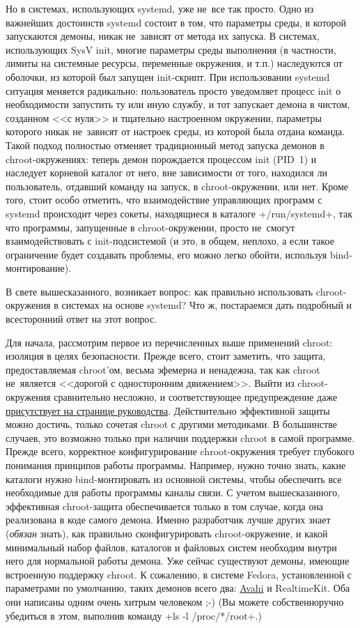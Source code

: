 \documentclass[10pt,oneside,a4paper]{article}
\begin{document}
Но в системах, использующих systemd, уже не~все так просто. Одно из важнейших
достоинств systemd состоит в том, что параметры среды, в которой запускаются
демоны, никак не~зависят от метода их запуска. В системах, использующих SysV
init, многие параметры среды выполнения (в частности, лимиты на системные
ресурсы, переменные окружения, и т.п.) наследуются от оболочки, из которой был
запущен init-скрипт. При использовании systemd ситуация меняется радикально:
пользователь просто уведомляет процесс init о необходимости запустить ту или
иную службу, и тот запускает демона в чистом, созданном <<с нуля>> и тщательно
настроенном окружении, параметры которого никак не~зависят от настроек среды, из
которой была отдана команда. Такой подход полностью отменяет традиционный метод
запуска демонов в chroot-окружениях: теперь демон порождается процессом init
(PID~1) и наследует корневой каталог от него, вне зависимости от того, находился
ли пользователь, отдавший команду на запуск, в chroot-окружении, или нет. Кроме
того, стоит особо отметить, что взаимодействие управляющих программ с systemd
происходит через сокеты, находящиеся в каталоге +/run/systemd+, так что
программы, запущенные в chroot-окружении, просто не~смогут взаимодействовать с
init-подсистемой (и это, в общем, неплохо, а если такое ограничение будет
создавать проблемы, его можно легко обойти, используя bind-монтирование).

В свете вышесказанного, возникает вопрос: как правильно использовать
chroot-окружения в системах на основе systemd? Что ж, постараемся дать подробный
и всесторонний ответ на этот вопрос.

Для начала, рассмотрим первое из перечисленных выше применений chroot: изоляция
в целях безопасности. Прежде всего, стоит заметить, что защита, предоставляемая
chroot'ом, весьма эфемерна и ненадежна, так как chroot не~является <<дорогой с
односторонним движением>>. Выйти из chroot-окружения сравнительно несложно, и
соответствующее предупреждение даже
\href{http://linux.die.net/man/2/chroot}{присутствует на странице руководства}.
Действительно эффективной защиты можно достичь, только сочетая chroot с другими
методиками. В большинстве случаев, это возможно только при наличии поддержки
chroot в самой программе. Прежде всего, корректное конфигурирование
chroot-окружения требует глубокого понимания принципов работы программы.
Например, нужно точно знать, какие каталоги нужно bind-монтировать из основной
системы, чтобы обеспечить все необходимые для работы программы каналы связи.  С
учетом вышесказанного, эффективная chroot-защита обеспечивается только в том
случае, когда она реализована в коде самого демона. Именно разработчик лучше
других знает (\emph{обязан} знать), как правильно сконфигурировать
chroot-окружение, и какой минимальный набор файлов, каталогов и файловых систем
необходим внутри него для нормальной работы демона. Уже сейчас существуют
демоны, имеющие встроенную поддержку chroot.  К сожалению, в системе Fedora,
установленной с параметрами по умолчанию, таких демонов всего два:
\href{http://avahi.org/}{Avahi} и RealtimeKit. Оба они написаны одним очень
хитрым человеком ;-) (Вы можете собственноручно убедиться в этом, выполнив
команду +ls -l /proc/*/root+.)
\end{document}
